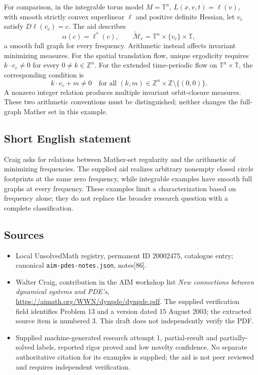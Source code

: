 \documentclass[11pt]{article}
\newcommand{\Z}{\mathbb{Z}}
\begin{document}
For comparison, in the integrable torus model \(M=\mathbb T^n\), \(L(x,v,t)=\ell(v)\), with smooth strictly convex superlinear \(\ell\) and positive definite Hessian, let \(v_c\) satisfy \(D\ell(v_c)=c\). The aid describes
\[
 \alpha(c)=\ell^*(c),\qquad
 \widetilde{\mathcal M}_c=\mathbb T^n\times\{v_c\}\times\mathbb T,
\]
a smooth full graph for every frequency. Arithmetic instead affects invariant minimizing measures. For the spatial translation flow, unique ergodicity requires \(k\cdot v_c\ne0\) for every \(0\ne k\in\Z^n\). For the extended time-periodic flow on \(\mathbb T^n\times\mathbb T\), the corresponding condition is
\[
 k\cdot v_c+m\ne0
 \quad\text{for all }(k,m)\in\Z^n\times\Z\setminus\{(0,0)\}.
\]
A nonzero integer relation produces multiple invariant orbit-closure measures. These two arithmetic conventions must be distinguished; neither changes the full-graph Mather set in this example.
\subsection{Short English statement}
Craig asks for relations between Mather-set regularity and the arithmetic of minimizing frequencies. The supplied aid realizes arbitrary nonempty closed circle footprints at the same zero frequency, while integrable examples have smooth full graphs at every frequency. These examples limit a characterization based on frequency alone; they do not replace the broader research question with a complete classification.
\subsection{Sources}
\begin{itemize}
\item Local UnsolvedMath registry, permanent ID 20002475, catalogue entry; canonical \texttt{aim-pdes-notes.json}, notes[86].
\item Walter Craig, contribution in the AIM workshop list \emph{New connections between dynamical systems and PDE's}, \url{https://aimath.org/WWN/dynpde/dynpde.pdf}. The supplied verification field identifies Problem 13 and a version dated 15 August 2003; the extracted source item is numbered 3. This draft does not independently verify the PDF.
\item Supplied machine-generated research attempt 1, partial-result and partially-solved labels, reported rigor proved and low novelty confidence. No separate authoritative citation for its examples is supplied; the aid is not peer reviewed and requires independent verification.
\end{itemize}
\end{document}
